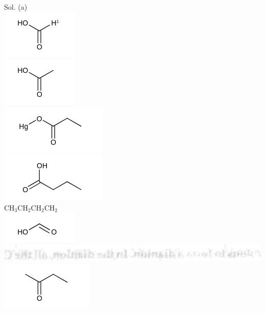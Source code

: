 \documentclass[10pt]{article}
\begin{document}
Sol. (a)\\
\includegraphics{smile-8b668934d4f3629ead5f1045624490adccf33de6}\\
\includegraphics{smile-fe1830f0ea038423b987a9976a58e08b904df066}\\
\includegraphics{smile-b2931dddc70f5d99c882420f657349b4df41487f}\\
\includegraphics{smile-fd38f3c937899aa9ac17f6d7bfffa21ea8f26746}\\
$\mathrm{CH}_{3} \mathrm{CH}_{2} \mathrm{CH}_{2} \mathrm{CH}_{2}$\\
\includegraphics{smile-82523d0c02860a28a58aa4b22fd9c5dd64443814}\\
\includegraphics[max width=\textwidth, center]{2025_01_28_8470952b98110cec3aabg-120}\\
\includegraphics{smile-b5a40771a51d0d0e762ae53aad9509cb32b2e051}\\
\end{document}
